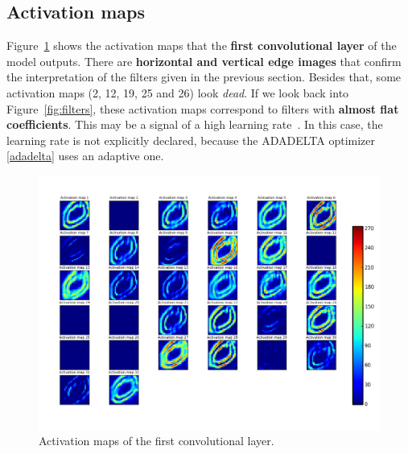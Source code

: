 \subsection{Activation maps}
Figure~\ref{fig:activation_maps} shows the activation maps that the \textbf{first convolutional layer} of the model outputs. There are \textbf{horizontal and vertical edge images} that confirm the interpretation of the filters given in the previous section. Besides that, some activation maps (2, 12, 19, 25 and 26) look \textit{dead}. If we look back into Figure~\ref{fig:filters}, these activation maps correspond to filters with \textbf{almost flat coefficients}. This may be a signal of a high learning rate~\cite{cs231n}. In this case, the learning rate is not explicitly declared, because the ADADELTA optimizer \ref{adadelta} uses an adaptive one.
\begin{figure}
	\centering
	\includegraphics[width=0.9\linewidth, keepaspectratio]{figures/activation_maps_conv2d_1.png}
	\caption{Activation maps of the first convolutional layer.}
	\label{fig:activation_maps}
\end{figure}

